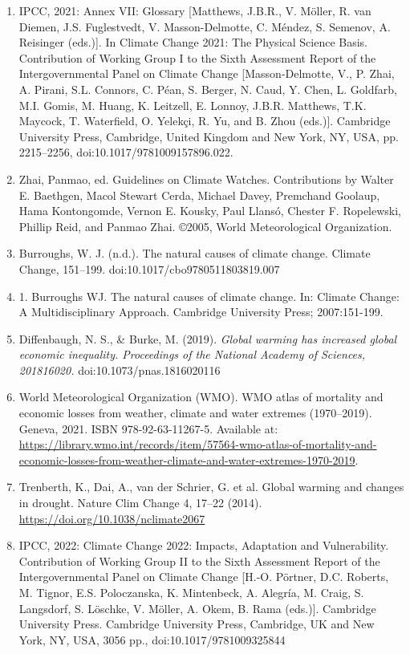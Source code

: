 \documentclass[12pt,a4paper,oneside]{book}
\begin{document}
\begin{enumerate}
\def\labelenumi{\arabic{enumi}.}
\item
  IPCC, 2021: Annex VII: Glossary {[}Matthews, J.B.R., V. Möller, R. van Diemen, J.S. Fuglestvedt, V. Masson-Delmotte, C. Méndez, S. Semenov, A. Reisinger (eds.){]}. In Climate Change 2021: The Physical Science Basis. Contribution of Working Group I to the Sixth Assessment Report of the Intergovernmental Panel on Climate Change {[}Masson-Delmotte, V., P. Zhai, A. Pirani, S.L. Connors, C. Péan, S. Berger, N. Caud, Y. Chen, L. Goldfarb, M.I. Gomis, M. Huang, K. Leitzell, E. Lonnoy, J.B.R. Matthews, T.K. Maycock, T. Waterfield, O. Yelekçi, R. Yu, and B. Zhou (eds.){]}. Cambridge University Press, Cambridge, United Kingdom and New York, NY, USA, pp. 2215--2256, doi:10.1017/9781009157896.022.
\item
  Zhai, Panmao, ed. Guidelines on Climate Watches. Contributions by Walter E. Baethgen, Macol Stewart Cerda, Michael Davey, Premchand Goolaup, Hama Kontongomde, Vernon E. Kousky, Paul Llansó, Chester F. Ropelewski, Phillip Reid, and Panmao Zhai. ©2005, World Meteorological Organization.
\item
  Burroughs, W. J. (n.d.). The natural causes of climate change. Climate Change, 151--199. doi:10.1017/cbo9780511803819.007
\item
  1. Burroughs WJ. The natural causes of climate change. In: Climate Change: A Multidisciplinary Approach. Cambridge University Press; 2007:151-199.
\item
  Diffenbaugh, N. S., \& Burke, M. (2019). \emph{Global warming has increased global economic inequality. Proceedings of the National Academy of Sciences, 201816020.} doi:10.1073/pnas.1816020116
\item
  World Meteorological Organization (WMO). WMO atlas of mortality and economic losses from weather, climate and water extremes (1970--2019). Geneva, 2021. ISBN 978-92-63-11267-5. Available at: \url{https://library.wmo.int/records/item/57564-wmo-atlas-of-mortality-and-economic-losses-from-weather-climate-and-water-extremes-1970-2019}.
\item
  Trenberth, K., Dai, A., van der Schrier, G. et al. Global warming and changes in drought. Nature Clim Change 4, 17--22 (2014). \url{https://doi.org/10.1038/nclimate2067}
\item
  IPCC, 2022: Climate Change 2022: Impacts, Adaptation and Vulnerability. Contribution of Working Group II to the Sixth Assessment Report of the Intergovernmental Panel on Climate Change {[}H.-O. Pörtner, D.C. Roberts, M. Tignor, E.S. Poloczanska, K. Mintenbeck, A. Alegría, M. Craig, S. Langsdorf, S. Löschke, V. Möller, A. Okem, B. Rama (eds.){]}. Cambridge University Press. Cambridge University Press, Cambridge, UK and New York, NY, USA, 3056 pp., doi:10.1017/9781009325844

\end{enumerate}
\end{document}
